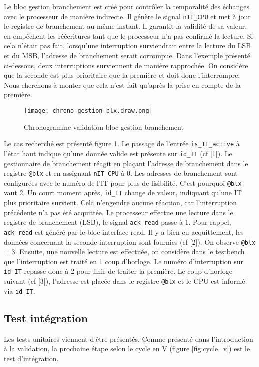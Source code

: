 Le bloc gestion branchement est créé pour contrôler la temporalité des échanges avec le processeur de manière indirecte.
Il génère le signal \texttt{nIT\_CPU} et met à jour le registre de branchement au même instant.
Il garantit la validité de sa valeur, en empêchent les réécritures tant que le processeur n'a pas confirmé la lecture.
Si cela n'était pas fait, lorsqu'une interruption surviendrait entre la lecture du LSB et du MSB, l'adresse de branchement serait corrompue.
Dans l'exemple présenté ci-dessous, deux interruptions surviennent de manière rapprochée.
On considère que la seconde est plus prioritaire que la première et doit donc l'interrompre.
Nous cherchons à monter que cela n'est fait qu'après la prise en compte de la première.
\begin{figure}[H]
    \centering
    \texttt{[image: chrono\_gestion\_blx.draw.png]}
    \caption{Chronogramme validation bloc gestion branchement}
    \label{fig:chrono_blx}
\end{figure}
Le cas recherché est présenté figure \ref{fig:chrono_blx}.
Le passage de l'entrée \texttt{is\_IT\_active} à l'état haut indique qu'une donnée valide est présente sur \texttt{id\_IT} (cf [1]).
Le gestionnaire de branchement réagit en plaçant l'adresse de branchement dans le registre \texttt{@blx} et en assignant \texttt{nIT\_CPU} à 0.
Les adresses de branchement sont configurées avec le numéro de l'IT pour plus de lisibilité.
C'est pourquoi \texttt{@blx} vaut 2.
Un court moment après, \texttt{id\_IT} change de valeur, indiquant qu'une IT plus prioritaire survient.
Cela n'engendre aucune réaction, car l'interruption précédente n'a pas été acquittée.
Le processeur effectue une lecture dans le registre de branchement (LSB), le signal \texttt{ack\_read} passe à 1.
Pour rappel, \texttt{ack\_read} est généré par le bloc interface read.
Il y a bien eu acquittement, les données concernant la seconde interruption sont fournies (cf [2]).
On observe \texttt{@blx} = 3.
Ensuite, une nouvelle lecture est effectuée, on considère dans le testbench que l'interruption est traité en 1 coup d'horloge.
Le numéro d'interruption sur \texttt{id\_IT} repasse donc à 2 pour finir de traiter la première.
Le coup d'horloge suivant (cf [3]), l'adresse est placée dans le registre \texttt{@blx} et le CPU est informé via \texttt{id\_IT}.

\subsection{Test intégration}
Les tests unitaires viennent d'être présentés. 
Comme présenté dans l'introduction à la validation, la prochaine étape selon le cycle en V (figure \ref{fig:cycle_v}) est le test d'intégration.


